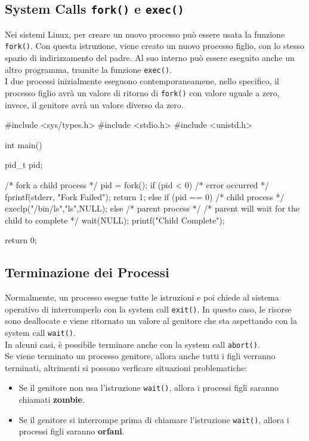 \subsection{System Calls \texttt{fork()} e \texttt{exec()}}
Nei sistemi Linux, per creare un nuovo processo può essere usata la funzione \texttt{fork()}. 
Con questa istruzione, viene creato un nuovo processo figlio, con lo stesso spazio di indirizzamento del padre. 
Al suo interno può essere eseguito anche un altro programma, tramite la funzione \texttt{exec()}. \\
I due processi inizialmente eseguono contemporaneamene, nello specifico, il processo figlio avrà un valore di ritorno di \texttt{fork()} con valore uguale a zero, invece, il genitore avrà un valore diverso da zero.

\begin{clang}
#include <sys/types.h>
#include <stdio.h>
#include <unistd.h>

int main()
{
  pid_t pid;
  
  /* fork a child process */
  pid = fork();
  if (pid < 0) { /* error occurred */
    fprintf(stderr, "Fork Failed");
  return 1;
  }
  else if (pid == 0) { /* child process */
    execlp("/bin/ls","ls",NULL);
  }
  else { /* parent process */
    /* parent will wait for the child to complete */
    wait(NULL);
    printf("Child Complete");
  }
}

return 0;
\end{clang}

\subsection{Terminazione dei Processi}
Normalmente, un processo esegue tutte le istruzioni e poi chiede al sistema operativo di interromperlo con la system call \texttt{exit()}. 
In questo caso, le risorse sono deallocate e viene ritornato un valore al genitore che sta aspettando con la system call \texttt{wait()}. \\ 
In alcuni casi, è possibile terminare anche con la system call \texttt{abort()}. \\ 
\vspace*{0.01\textheight}
Se viene terminato un processo genitore, allora anche tutti i figli verranno terminati, altrimenti si possono verficare situazioni problematiche:
\begin{itemize}
  \item Se il genitore non usa l'istruzione \texttt{wait()}, allora i processi figli saranno chiamati \textbf{zombie}.
  \item Se il genitore si interrompe prima di chiamare l'istruzione \texttt{wait()}, allora i processi figli saranno \textbf{orfani}.
\end{itemize}

